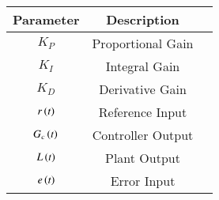 \begin{tabular}{|c|c|c|}
\hline
\textbf{Parameter} & \textbf{Description} \\ \hline
$K_{P}$ & Proportional Gain \\ \hline
$K_{I}$ & Integral Gain  \\ \hline
$K_{D}$ & Derivative Gain  \\ \hline
$r\left(t\right)$& Reference Input \\ \hline 
$G_c\left(t\right)$& Controller Output \\ \hline 
$L\left(t\right)$ & Plant Output  \\ \hline
$e\left(t\right)$ & Error Input  \\ \hline
\end{tabular}

